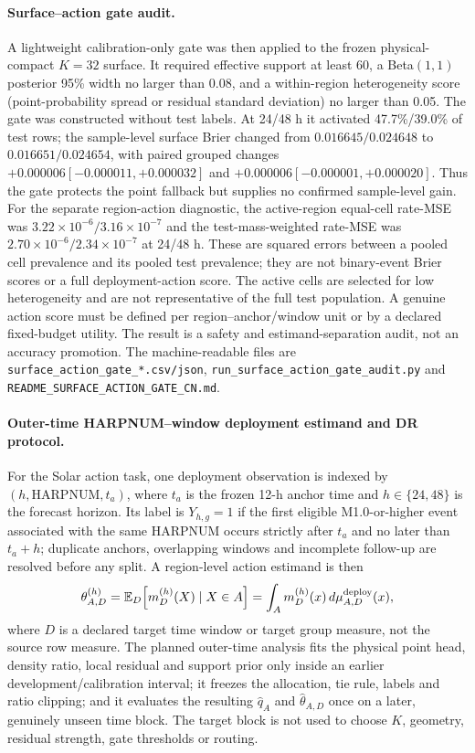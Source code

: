 \documentclass[11pt,a4paper]{article}
\numberwithin{equation}{section}
\theoremstyle{definition}\newtheorem{definition}[theorem]{Definition}
\theoremstyle{remark}\newtheorem{remark}[theorem]{Remark}
\begin{document}
\paragraph{Surface--action gate audit.}
A lightweight calibration-only gate was then applied to the frozen physical-compact $K=32$ surface. It required effective support at least 60, a Beta$(1,1)$ posterior 95\% width no larger than 0.08, and a within-region heterogeneity score (point-probability spread or residual standard deviation) no larger than 0.05. The gate was constructed without test labels. At 24/48 h it activated 47.7\%/39.0\% of test rows; the sample-level surface Brier changed from $0.016645/0.024648$ to $0.016651/0.024654$, with paired grouped changes $+0.000006[-0.000011,+0.000032]$ and $+0.000006[-0.000001,+0.000020]$. Thus the gate protects the point fallback but supplies no confirmed sample-level gain. For the separate region-action diagnostic, the active-region equal-cell rate-MSE was $3.22\times10^{-6}/3.16\times10^{-7}$ and the test-mass-weighted rate-MSE was $2.70\times10^{-6}/2.34\times10^{-7}$ at 24/48 h. These are squared errors between a pooled cell prevalence and its pooled test prevalence; they are not binary-event Brier scores or a full deployment-action score. The active cells are selected for low heterogeneity and are not representative of the full test population. A genuine action score must be defined per region--anchor/window unit or by a declared fixed-budget utility. The result is a safety and estimand-separation audit, not an accuracy promotion. The machine-readable files are \texttt{surface\_action\_gate\_*.csv/json}, \texttt{run\_surface\_action\_gate\_audit.py} and \texttt{README\_SURFACE\_ACTION\_GATE\_CN.md}.

\paragraph{Outer-time HARPNUM--window deployment estimand and DR protocol.}
For the Solar action task, one deployment observation is indexed by $(h,\mathrm{HARPNUM},t_a)$, where $t_a$ is the frozen 12-h anchor time and $h\in\{24,48\}$ is the forecast horizon. Its label is $Y_{h,g}=1$ if the first eligible M1.0-or-higher event associated with the same HARPNUM occurs strictly after $t_a$ and no later than $t_a+h$; duplicate anchors, overlapping windows and incomplete follow-up are resolved before any split. A region-level action estimand is then
\[
 \theta_{A,D}^{(h)}=\mathbb E_{D}\!\left[m_D^{(h)}(X)\mid X\in A\right]
 =\int_A m_D^{(h)}(x)\,d\mu_{A,D}^{\rm deploy}(x),
\]
where $D$ is a declared target time window or target group measure, not the source row measure. The planned outer-time analysis fits the physical point head, density ratio, local residual and support prior only inside an earlier development/calibration interval; it freezes the allocation, tie rule, labels and ratio clipping; and it evaluates the resulting $\widehat q_A$ and $\widehat\theta_{A,D}$ once on a later, genuinely unseen time block. The target block is not used to choose $K$, geometry, residual strength, gate thresholds or routing.
\end{document}
